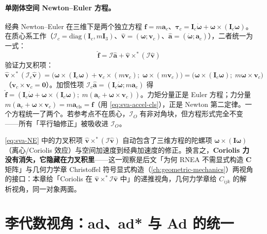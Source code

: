 \paragraph{单刚体空间 Newton--Euler 方程。}
经典 Newton--Euler 在三维下是两个独立方程 $\mathbf f=m\mathbf a_c$、$\boldsymbol\tau_c=\mathbf I_c\dot{\boldsymbol\omega}+\boldsymbol\omega\times(\mathbf I_c\boldsymbol\omega)$。在质心系工作（$\mathcal I_c=\mathrm{diag}(\mathbf I_c,m\mathbf I_3)$、$\hat{\mathbf v}=(\boldsymbol\omega;\mathbf v_c)$、$\hat{\mathbf a}=(\dot{\boldsymbol\omega};\mathbf a_c)$），二者统一为一式：
\begin{equation}
  \boxed{\;\hat{\mathbf f}=\mathcal I\hat{\mathbf a}+\hat{\mathbf v}\times^*(\mathcal I\hat{\mathbf v})\;}
  \label{eq:sva-NE}
\end{equation}
验证力叉积项：
$\hat{\mathbf v}\times^*(\mathcal I_c\hat{\mathbf v})=\big(\boldsymbol\omega\times(\mathbf I_c\boldsymbol\omega)+\mathbf v_c\times(m\mathbf v_c);\;\boldsymbol\omega\times(m\mathbf v_c)\big)=\big(\boldsymbol\omega\times(\mathbf I_c\boldsymbol\omega);\;m\boldsymbol\omega\times\mathbf v_c\big)$（$\mathbf v_c\times\mathbf v_c=\mathbf 0$）。加惯性项 $\mathcal I_c\hat{\mathbf a}=(\mathbf I_c\dot{\boldsymbol\omega};m\mathbf a_c)$ 得 $\hat{\mathbf f}=(\mathbf I_c\dot{\boldsymbol\omega}+\boldsymbol\omega\times(\mathbf I_c\boldsymbol\omega);\;m(\mathbf a_c+\boldsymbol\omega\times\mathbf v_c))$。力矩分量正是 Euler 方程；力分量 $m(\mathbf a_c+\boldsymbol\omega\times\mathbf v_c)=m\mathbf a_{\text{cls}}=\mathbf f$（用 \cref{eq:sva-accel-cls}），正是 Newton 第二定律。一个方程统一了两个。若参考点不在质心，$\mathcal I_O$ 有非对角块，但方程形式完全不变——所有「平行轴修正」被吸收进 $\mathcal I_O$。

\begin{insight}
\cref{eq:sva-NE} 中的力叉积项 $\hat{\mathbf v}\times^*(\mathcal I\hat{\mathbf v})$ 自动包含了三维方程的陀螺项 $\boldsymbol\omega\times(\mathbf I\boldsymbol\omega)$（离心/Coriolis 效应）与空间加速度到经典加速度的修正。换言之，\textbf{Coriolis 力没有消失，它隐藏在力叉积里}——这一观察是后文「为何 RNEA 不需显式构造 $\mathbf C$ 矩阵」与几何力学章 Christoffel 符号显式构造（\cref{ch:geometric-mechanics}）两视角的接口：本章给「Coriolis 在 $\hat{\mathbf v}\times^*\mathcal I\hat{\mathbf v}$ 中」的递推视角，几何力学章给 $C_{ijk}$ 的解析视角，同一对象两面。
\end{insight}

\section{李代数视角：ad、ad* 与 Ad 的统一}
\label{sec:sva-lie}

